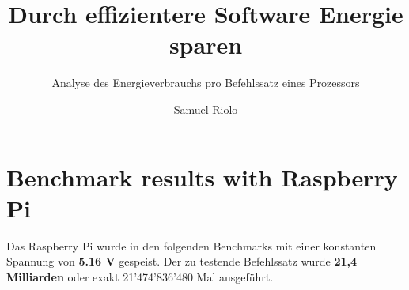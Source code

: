 \documentclass{../template/ffhsthesis}
\begin{document}


\title{Durch effizientere Software Energie sparen}
\subtitle{Analyse des Energieverbrauchs pro Befehlssatz eines Prozessors} %
\author{Samuel Riolo}

\maketitle



\startThesis
\chapter{Benchmark results with Raspberry Pi}
Das Raspberry Pi wurde in den folgenden Benchmarks mit einer konstanten Spannung von \textbf{5.16 V} gespeist. Der zu testende Befehlssatz wurde \textbf{21,4 Milliarden} oder exakt 21'474'836'480 Mal ausgeführt.

\tikzset{every picture/.style=thick}
\end{document}
